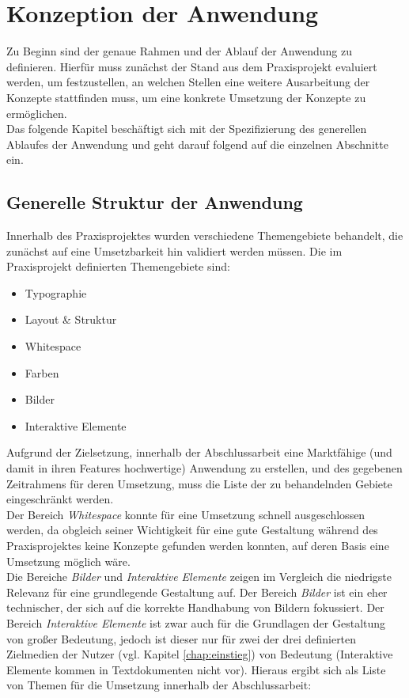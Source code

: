\chapter{Konzeption der Anwendung}
\thispagestyle{fancy}
\label{chap:concept}

Zu Beginn sind der genaue Rahmen und der Ablauf der Anwendung zu definieren. Hierfür muss zunächst der Stand aus dem Praxisprojekt evaluiert werden, um festzustellen, an welchen Stellen eine weitere Ausarbeitung der Konzepte stattfinden muss, um eine konkrete Umsetzung der Konzepte zu ermöglichen.\\
Das folgende Kapitel beschäftigt sich mit der Spezifizierung des generellen Ablaufes der Anwendung und geht darauf folgend auf die einzelnen Abschnitte ein.

\section{Generelle Struktur der Anwendung}
\label{chap:pp}

Innerhalb des Praxisprojektes wurden verschiedene Themengebiete behandelt, die zunächst auf eine Umsetzbarkeit hin validiert werden müssen. Die im Praxisprojekt definierten Themengebiete \cite{PoplawskiPP} sind:

\begin{itemize}
  \item Typographie
  \item Layout \& Struktur
  \item Whitespace
  \item Farben
  \item Bilder
  \item Interaktive Elemente
\end{itemize}

Aufgrund der Zielsetzung, innerhalb der Abschlussarbeit eine Marktfähige (und damit in ihren Features hochwertige) Anwendung zu erstellen, und des gegebenen Zeitrahmens für deren Umsetzung, muss die Liste der zu behandelnden Gebiete eingeschränkt werden.\\
Der Bereich \textit{Whitespace} konnte für eine Umsetzung schnell ausgeschlossen werden, da obgleich seiner Wichtigkeit für eine gute Gestaltung während des Praxisprojektes keine Konzepte gefunden werden konnten, auf deren Basis eine Umsetzung möglich wäre.\\
Die Bereiche \textit{Bilder} und \textit{Interaktive Elemente} zeigen im Vergleich die niedrigste Relevanz für eine grundlegende Gestaltung auf. Der Bereich \textit{Bilder} ist ein eher technischer, der sich auf die korrekte Handhabung von Bildern fokussiert. Der Bereich \textit{Interaktive Elemente} ist zwar auch für die Grundlagen der Gestaltung von großer Bedeutung, jedoch ist dieser nur für zwei der drei definierten Zielmedien der Nutzer (vgl. Kapitel \ref{chap:einstieg}) von Bedeutung (Interaktive Elemente kommen in Textdokumenten nicht vor). Hieraus ergibt sich als Liste von Themen für die Umsetzung innerhalb der Abschlussarbeit:

